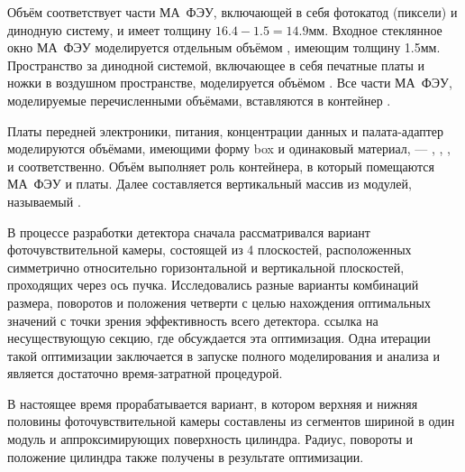 Объём  соответствует части МА~ФЭУ, включающей в себя фотокатод (пиксели) и динодную систему, и имеет толщину $16.4-1.5=14.9$мм. Входное стеклянное окно МА~ФЭУ моделируется отдельным объёмом , имеющим толщину 1.5мм. Пространство за динодной системой, включающее в себя печатные платы и ножки в воздушном пространстве, моделируется объёмом . Все части МА~ФЭУ, моделируемые перечисленными объёмами, вставляются в контейнер .

Платы передней электроники, питания, концентрации данных и палата-адаптер моделируются объёмами, имеющими форму box и одинаковый материал, --- , , , и  соответственно. Объём  выполняет роль контейнера, в который помещаются МА~ФЭУ и платы. Далее составляется вертикальный массив из  модулей, называемый .

В процессе разработки детектора сначала рассматривался вариант фоточувствительной камеры, состоящей из 4 плоскостей, расположенных симметрично относительно горизонтальной и вертикальной плоскостей, проходящих через ось пучка. Исследовались разные варианты комбинаций размера, поворотов и положения четверти с целью нахождения оптимальных значений с точки зрения эффективность всего детектора. \todo ссылка на несуществующую секцию, где обсуждается эта оптимизация. Одна итерации такой оптимизации заключается в запуске полного моделирования и анализа и является достаточно время-затратной процедурой.

В настоящее время прорабатывается вариант, в котором верхняя и нижняя половины фоточувствительной камеры составлены из сегментов шириной в один модуль и аппроксимирующих поверхность цилиндра. Радиус, повороты и положение цилиндра также получены в результате оптимизации.

